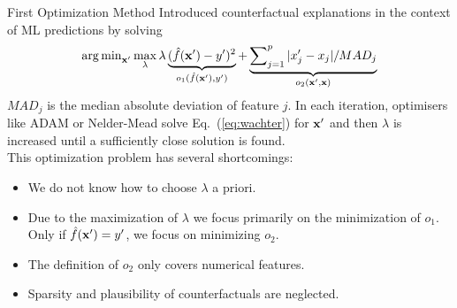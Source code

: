 \documentclass[11pt,compress,t,notes=noshow, aspectratio=169, xcolor=table]{beamer}
\begin{document}
\begin{frame}{First Optimization Method }
Introduced counterfactual explanations in the context of ML predictions by solving
		\begin{equation}
			\argmin_{\xv'} \max_{\lambda} \lambda \underbrace{(\fh(\xv') - y')^2}_{o_1(\fh(\xv'), y')} + \underbrace{\sum\nolimits_{j = 1}^p |x'_j - x_j|/MAD_j}_{o_2(\xv', \xv)}
			\label{eq:wachter}
		\end{equation}
	$MAD_j$ is the median absolute deviation of feature $j$. In each iteration, optimisers like ADAM or Nelder-Mead solve Eq.~(\ref{eq:wachter}) for $\xv'$ and then $\lambda$ is increased until a sufficiently close solution is found. \\[0.2cm]
	
	This optimization problem has several shortcomings: 	
	\begin{itemize}
		\item We do not know how to choose $\lambda$ a priori. 
		\item Due to the maximization of $\lambda$ we focus primarily on the minimization of $o_1$. Only if $\fh(\xv') = y'$, we focus on minimizing $o_2$. 
		\item The definition of $o_2$ only covers numerical features. 
		\item Sparsity and plausibility of counterfactuals are neglected. 
	\end{itemize}
	


\end{frame}
\end{document}

